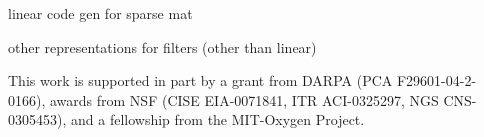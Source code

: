 \documentclass{csailabstractbook}
\begin{document}
linear code gen for sparse mat



other representations for filters (other than linear)

This work is supported in part by a grant from DARPA (PCA
F29601-04-2-0166), awards from NSF (CISE EIA-0071841, ITR ACI-0325297,
NGS CNS-0305453), and a fellowship from the MIT-Oxygen Project.


\end{document}
